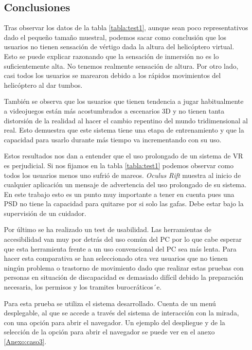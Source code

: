\subsection{Conclusiones}

Tras observar los datos de la tabla \ref{tabla:test1}, aunque sean poco representativos dado el peque\~no tama\~no muestral, podemos sacar como conclusi\'on que los usuarios no tienen sensaci\'on de v\'ertigo dada la altura del helic\'optero virtual. Esto se puede explicar razonando que la sensaci\'on de inmersi\'on no es lo suficientemente alta. No tenemos realmente sensaci\'on de altura. Por otro lado, casi todos los usuarios se marearon debido a los r\'apidos movimientos del helic\'optero al dar tumbos.

Tambi\'en se observa que los usuarios que tienen tendencia a jugar habitualmente a videojuegos est\'an m\'as acostumbrados a escenarios 3D y no tienen tanta distorsi\'on de la realidad al hacer el cambio repentino del mundo tridimensional al real. Esto demuestra que este sistema tiene una etapa de entrenamiento y que la capacidad para usarlo durante m\'as tiempo va incrementando con su uso.


Estos resultados nos dan a entender que el uso prolongado de un sistema de VR es perjudicial. Si nos fijamos en la tabla \ref{tabla:test1} podemos observar como todos los usuarios menos uno sufri\'o de mareos. \emph{Oculus Rift} muestra al inicio de cualquier aplicaci\'on un mensaje de advertencia del uso prolongado de su sistema. En este trabajo esto es un punto muy importante a tener en cuenta pues una PSD no tiene la capacidad para quitarse por si solo las gafas. Debe estar bajo la supervisi\'on de un cuidador.

\label{sect:rv_sickness}

Por \'ultimo se ha realizado un test de usabilidad. Las herramientas de accesibilidad van muy por detr\'as del uso com\'un del PC por lo que cabe esperar que esta herramienta frente a un uso convencional del PC sea m\'as lenta. Para hacer esta comparativa se han seleccionado otra vez usuarios que no tienen ning\'un problema o trastorno de movimiento dado que realizar estas pruebas con personas en situaci\'on de discapacidad es demasiado dif\'icil debido la preparaci\'on necesaria, los permisos y los tramites burocr\'aticos´e.

Para esta prueba se utiliza el sistema desarrollado. Cuenta de un men\'u desplegable, al que se accede a trav\'es del sistema de interacci\'on con la mirada, con una opci\'on para abrir el navegador. Un ejemplo del despliegue y de la selecci\'on de la opci\'on para abrir el navegador se puede ver en el anexo \ref{Anexo:caso3}.
 
